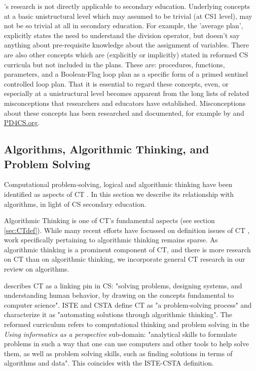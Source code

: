 \citeauthor{deRaadt2009teachingPlans}'s research is not directly applicable to secondary education. Underlying concepts at a basic unistructural level which may assumed to be trivial (at CS1 level), may not be so trivial at all in secondary education. For example, the 'average plan', explicitly states the need to understand the division operator, but doesn't say anything about pre-requisite knowledge about the assignment of variables. There are also other concepts which are (explicitly or implicitly) stated in reformed CS curricula but not included in the plans. These are: procedures, functions, parameters, and a Boolean-Flag loop plan as a specific form of a primed sentinel controlled loop plan. That it is essential to regard these concepts, even, or especially at a unistructural level becomes apparent from the long lists of related misconceptions that researchers and educators have established. Misconceptions about these concepts has been researched and documented, for example by \citeauthor{sorva2012misconceptions} and \url{PD4CS.org}.



\subsection{Algorithms, Algorithmic Thinking, and Problem Solving}\label{sec:AlgProblemSolving}
Computational problem-solving, logical and algorithmic thinking have been identified as aspects of CT \cite{grover2017measuring}. In this section we describe its relationship with algorithms, in light of CS secondary education.

Algorithmic Thinking is one of CT's fundamental aspects (see section \ref{sec:CTdef}). While many recent efforts have focussed on definition issues of CT \cite{GroverPea2013}, work specifically pertaining to algorithmic thinking remains sparse. As algorithmic thinking is a prominent component of CT, and there is more research on CT than on algorithmic thinking, we incorporate general CT research in our review on algorithms.


 describes CT as a linking pin in CS: "solving problems, designing systems, and understanding human behavior, by drawing on the concepts fundamental to computer science". ISTE and CSTA define CT as "a problem-solving process"\cite{CSTA2011CT} and characterize it as "automating solutions through algorithmic thinking". The reformed curriculum refers to computational thinking and problem solving in the \emph{Using informatics as a perspective} sub-domain: "analytical skills to formulate problems in such a way that one can use computers and other tools to help solve them, as well as problem solving skills,
such as finding solutions in terms of algorithms and data"\cite{Barendsen2016}. This coincides with the ISTE-CSTA definition.




